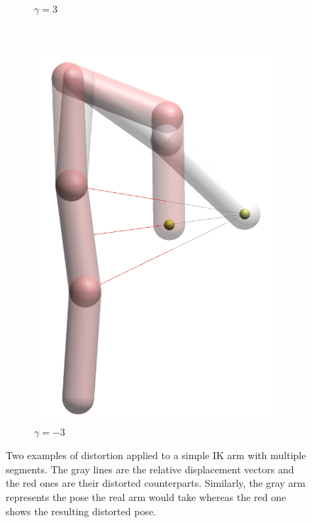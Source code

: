 \begin{figure}
\begin{subfigure}[b]{0.2\textwidth}
        \caption{$\gamma = 3$}
    \end{subfigure}
    ~ %
    \begin{subfigure}[b]{0.2\textwidth}
        \includegraphics[width=\textwidth]{Figures/simple_distortion_-3.png}
        \caption{$\gamma = -3$}
    \end{subfigure}
    \caption{Two examples of distortion applied to a simple IK arm with multiple segments. The gray lines are the relative displacement vectors and the red ones are their distorted counterparts. Similarly, the gray arm represents the pose the real arm would take whereas the red one shows the resulting distorted pose. }\label{fig:armExamples}
\end{figure}


